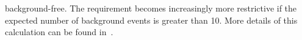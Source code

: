 \begin{asparaenum}
background-free.  The requirement becomes increasingly more restrictive if the expected number of background events is greater than \num{10}.  More details of this calculation can be found in~\cite{Westerdale:2016ub}.
%
%
%
%

\end{asparaenum}
